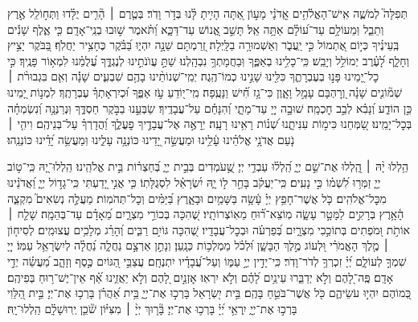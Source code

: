 \documentclass[twoside, openany, parskip=half, 11pt]{book}
\begin{document}
\begin{narrow}
תְּפִלָּה֮ לְמֹשֶׁ֢ה אִֽישׁ־הָאֱלֹ֫הִ֥ים
אֲֽדֹנָ֗י מָע֣וֹן אַ֭תָּה הָיִ֥יתָ לָּ֗נוּ בְּדֹ֣ר וָדֹֽר׃
בְּטֶ֤רֶם ׀ הָ֘רִ֤ים יֻלָּ֗דוּ וַתְּח֣וֹלֵֽל אֶ֣רֶץ וְתֵבֵ֑ל וּֽמֵעוֹלָ֥ם עַד־ע֝וֹלָ֗ם אַתָּ֥ה אֵֽל׃
תָּשֵׁ֣ב אֱ֭נוֹשׁ עַד־דַּכָּ֑א וַ֝תֹּ֗אמֶר שׁ֣וּבוּ בְנֵֽי־אָדָֽם׃
כִּ֤י אֶ֪לֶף שָׁנִ֡ים בְּֽעֵינֶ֗יךָ כְּי֣וֹם אֶ֭תְמוֹל כִּ֣י יַֽעֲבֹ֑ר וְאַשְׁמוּרָ֥ה בַלָּֽיְלָה׃
זְ֭רַמְתָּם שֵׁנָ֣ה יִהְי֑וּ בַּ֝בֹּ֗קֶר כֶּחָצִ֥יר יַחֲלֹֽף׃
בַּ֭בֹּקֶר יָצִ֣יץ וְחָלָ֑ף לָ֝עֶ֗רֶב יְמוֹלֵ֥ל וְיָבֵֽשׁ׃
כִּֽי־כָלִ֥ינוּ בְאַפֶּ֑ךָ וּֽבַחֲמָתְךָ֥ נִבְהָֽלְנוּ׃
שַׁתָּ֣ עֲוֺנֹתֵ֣ינוּ לְנֶגְדֶּ֑ךָ עֲ֝לֻמֵ֗נוּ לִמְא֥וֹר פָּנֶֽיךָ׃
כִּ֣י כׇל־יָ֭מֵינוּ פָּנ֣וּ בְעֶבְרָתֶ֑ךָ כִּלִּ֖ינוּ שָׁנֵ֣ינוּ כְמוֹ־הֶֽגֶה׃
יְמֵֽי־שְׁנוֹתֵ֨ינוּ בָהֶ֥ם שִׁבְעִ֪ים שָׁנָ֡ה וְאִ֤ם בִּגְבוּרֹ֨ת ׀ שְׁמ֘וֹנִ֤ים שָׁנָ֗ה וְ֭רׇהְבָּם עָמָ֣ל וָאָ֑וֶן כִּי־גָ֥ז חִ֗֝ישׁ וַנָּעֻֽפָה׃
מִֽי־י֭וֹדֵעַ עֹ֣ז אַפֶּ֑ךָ וּ֝כְיִרְאָתְךָ֗ עֶבְרָתֶֽךָ׃
לִמְנ֣וֹת יָ֭מֵינוּ כֵּ֣ן הוֹדַ֑ע וְ֝נָבִ֗א לְבַ֣ב חׇכְמָֽה׃
שׁוּבָ֣ה יְיָ֭ עַד־מָתָ֑י וְ֝הִנָּחֵ֗ם עַל־עֲבָדֶֽיךָ׃
שַׂבְּעֵ֣נוּ בַבֹּ֣קֶר חַסְדֶּ֑ךָ וּֽנְרַנְּנָ֥ה וְ֝נִשְׂמְחָ֗ה בְּכׇל־יָמֵֽינוּ׃
שַׂ֭מְּחֵנוּ כִּימ֣וֹת עִנִּיתָ֑נוּ שְׁ֝נ֗וֹת רָאִ֥ינוּ רָעָֽה׃
יֵרָאֶ֣ה אֶל־עֲבָדֶ֣יךָ פׇעֳלֶ֑ךָ וַ֝הֲדָרְךָ֗ עַל־בְּנֵיהֶֽם׃
וִיהִ֤י ׀ נֹ֤עַם אֲדֹנָ֥י אֱלֹהֵ֗ינוּ עָ֫לֵ֥ינוּ וּמַעֲשֵׂ֣ה יָ֭דֵינוּ כּוֹנְנָ֥ה עָלֵ֑ינוּ וּֽמַעֲשֵׂ֥ה יָ֝דֵ֗ינוּ כּוֹנְנֵֽהוּ׃

\tzadialeph

הַ֥לְלוּ יָ֨הּ ׀
הַֽ֭לְלוּ אֶת־שֵׁ֣ם יְיָ֑ הַֽ֝לְל֗וּ עַבְדֵ֥י יְיָ׃
שֶׁ֣֭עֹמְדִים בְּבֵ֣ית יְיָ֑ בְּ֝חַצְר֗וֹת בֵּ֣ית אֱלֹהֵֽינוּ׃
הַֽלְלוּ־יָ֭הּ כִּֽי־ט֣וֹב יְיָ֑ זַמְּר֥וּ לִ֝שְׁמ֗וֹ כִּ֣י נָעִֽים׃
כִּֽי־יַעֲקֹ֗ב בָּחַ֣ר ל֣וֹ יָ֑הּ יִ֝שְׂרָאֵ֗ל לִסְגֻלָּתֽוֹ׃
כִּ֤י אֲנִ֣י יָ֭דַעְתִּי כִּֽי־גָד֣וֹל יְיָ֑ וַ֝אֲדֹנֵ֗ינוּ מִכׇּל־אֱלֹהִֽים׃
כֹּ֤ל אֲשֶׁר־חָפֵ֥ץ יְיָ֗ עָ֫שָׂ֥ה בַּשָּׁמַ֥יִם וּבָאָ֑רֶץ בַּ֝יַּמִּ֗ים וְכׇל־תְּהֹמֽוֹת׃
מַעֲלֶ֣ה נְשִׂאִים֮ מִקְצֵ֢ה הָ֫אָ֥רֶץ בְּרָקִ֣ים לַמָּטָ֣ר עָשָׂ֑ה מֽוֹצֵא־ר֗֝וּחַ מֵאֽוֹצְרוֹתָֽיו׃
שֶׁ֭הִכָּה בְּכוֹרֵ֣י מִצְרָ֑יִם מֵ֝אָדָ֗ם עַד־בְּהֵמָֽה׃
שָׁלַ֤ח ׀ אוֹתֹ֣ת וּ֭מֹפְתִים בְּתוֹכֵ֣כִי מִצְרָ֑יִם בְּ֝פַרְעֹ֗ה וּבְכׇל־עֲבָדָֽיו׃
שֶׁ֭הִכָּה גּוֹיִ֣ם רַבִּ֑ים וְ֝הָרַ֗ג מְלָכִ֥ים עֲצוּמִֽים׃
לְסִיח֤וֹן ׀ מֶ֤לֶךְ הָאֱמֹרִ֗י וּ֭לְעוֹג מֶ֣לֶךְ הַבָּשָׁ֑ן וּ֝לְכֹ֗ל מַמְלְכ֥וֹת כְּנָֽעַן׃
וְנָתַ֣ן אַרְצָ֣ם נַחֲלָ֑ה נַ֝חֲלָ֗ה לְיִשְׂרָאֵ֥ל עַמּֽוֹ׃
יְיָ֭ שִׁמְךָ֣ לְעוֹלָ֑ם יְ֝יָ֗ זִכְרְךָ֥ לְדֹר־וָדֹֽר׃
כִּֽי־יָדִ֣ין יְיָ֣ עַמּ֑וֹ וְעַל־עֲ֝בָדָ֗יו יִתְנֶחָֽם׃
עֲצַבֵּ֣י הַ֭גּוֹיִם כֶּ֣סֶף וְזָהָ֑ב מַ֝עֲשֵׂ֗ה יְדֵ֣י אָדָֽם׃
פֶּֽה־לָ֭הֶם וְלֹ֣א יְדַבֵּ֑רוּ עֵינַ֥יִם לָ֝הֶ֗ם וְלֹ֣א יִרְאֽוּ׃
אׇזְנַ֣יִם לָ֭הֶם וְלֹ֣א יַאֲזִ֑ינוּ אַ֗֝ף אֵין־יֶשׁ־ר֥וּחַ בְּפִיהֶֽם׃
כְּ֭מוֹהֶם יִהְי֣וּ עֹשֵׂיהֶ֑ם כֹּ֖ל אֲשֶׁר־בֹּטֵ֣חַ בָּהֶֽם׃
בֵּ֣ית יִ֭שְׂרָאֵל בָּרְכ֣וּ אֶת־יְיָ֑ בֵּ֥ית אַ֝הֲרֹ֗ן בָּרְכ֥וּ אֶת־יְיָ׃
בֵּ֣ית הַ֭לֵּוִי בָּרְכ֣וּ אֶת־יְיָ֑ יִֽרְאֵ֥י יְ֝יָ֗ בָּרְכ֥וּ אֶת־יְיָ׃
בָּ֘ר֤וּךְ יְיָ֨ ׀ מִצִּיּ֗וֹן שֹׁ֘כֵ֤ן יְֽרוּשָׁלָ֗‍ִם הַֽלְלוּ־יָֽהּ׃




\end{narrow}
\end{document}
